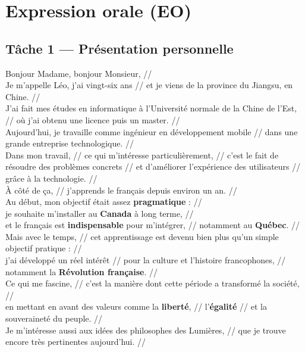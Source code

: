 \documentclass[12pt,a4paper]{article}
\begin{document}
\section{Expression orale (EO)}

\subsection{Tâche 1 — Présentation personnelle}

\begin{tcolorbox}[title=\textbf{Présentation formelle ($\approx$ 1 min)}]
Bonjour Madame, bonjour Monsieur, // \\

Je m'appelle Léo, j'ai vingt-six ans // et je viens de la province du Jiangsu, en Chine. // \\

J'ai fait mes études en informatique à l'Université normale de la Chine de l'Est, // où j'ai obtenu une licence puis un master. // \\
Aujourd'hui, je travaille comme ingénieur en développement mobile // dans une grande entreprise technologique. // \\

Dans mon travail, // ce qui m'intéresse particulièrement, // c'est le fait de résoudre des problèmes concrets // et d'améliorer l'expérience des utilisateurs // grâce à la technologie. // \\

À côté de ça, // j'apprends le français depuis environ un an. // \\
Au début, mon objectif était assez \textbf{pragmatique} : // \\
je souhaite m'installer au \textbf{Canada} à long terme, // \\
et le français est \textbf{indispensable} pour m'intégrer, // notamment au \textbf{Québec}. // \\

Mais avec le temps, // cet apprentissage est devenu bien plus qu'un simple objectif pratique : // \\
j'ai développé un réel intérêt // pour la culture et l'histoire francophones, // notamment la \textbf{Révolution française}. // \\

Ce qui me fascine, // c'est la manière dont cette période a transformé la société, // \\
en mettant en avant des valeurs comme la \textbf{liberté}, // l'\textbf{égalité} // et la souveraineté du peuple. // \\
Je m'intéresse aussi aux idées des philosophes des Lumières, // que je trouve encore très pertinentes aujourd'hui. // \\


\end{tcolorbox}
\end{document}
